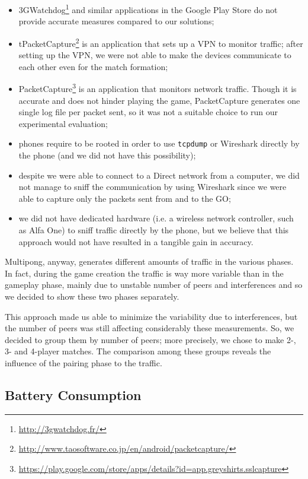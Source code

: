 \begin{itemize}
  \item 3GWatchdog\footnote{\url{http://3gwatchdog.fr/}} and similar
    applications in the Google Play Store do not provide accurate measures
    compared to our solutions;
  \item tPacketCapture\footnote{\url{http://www.taosoftware.co.jp/en/android/packetcapture/}}
    is an application that sets up a VPN to monitor traffic; after setting up
    the VPN, we were not able to make the devices communicate to each other
    even for the match formation;
  \item PacketCapture\footnote{\url{https://play.google.com/store/apps/details?id=app.greyshirts.sslcapture}}
    is an application that monitors network traffic. Though it is accurate and
    does not hinder playing the game, PacketCapture generates one single log
    file per packet sent, so it was not a suitable choice to run our
    experimental evaluation;
  \item phones require to be rooted in order to use \texttt{tcpdump} or
    Wireshark directly by the phone (and we did not have this possibility);
  \item despite we were able to connect to a \wifi{} Direct network from a
    computer, we did not manage to sniff the communication by using Wireshark
    since we were able to capture only the packets sent from and to the GO;
  \item we did not have dedicated hardware (i.e. a wireless network controller, 
    such as Alfa One) to sniff traffic directly by the phone, but we believe 
    that this approach would not have resulted in a tangible gain in accuracy.
\end{itemize}

Multipong, anyway, generates different amounts of traffic in the various
phases. In fact, during the game creation the traffic is way more variable than
in the gameplay phase, mainly due to unstable number of peers and \wifi{}
interferences and so we decided to show these two phases separately.

This approach made us able to minimize the variability due to interferences, 
but the number of peers was still affecting considerably these measurements. 
So, we decided to group them by number of peers; more precisely, we chose to 
make 2-, 3- and 4-player matches. The comparison among these groups reveals 
the influence of the pairing phase to the traffic.

\subsection{Battery Consumption}

